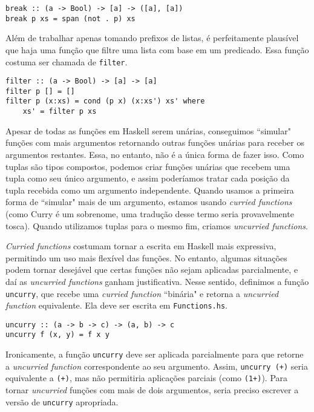 \documentclass[a4paper]{article}
\begin{document}
\begin{verbatim}
break :: (a -> Bool) -> [a] -> ([a], [a])
break p xs = span (not . p) xs
\end{verbatim}

Além de trabalhar apenas tomando prefixos de listas, é perfeitamente plausível que haja uma função que filtre uma lista com base em um predicado.
Essa função costuma ser chamada de \texttt{filter}.

\begin{verbatim}
filter :: (a -> Bool) -> [a] -> [a]
filter p [] = []
filter p (x:xs) = cond (p x) (x:xs') xs' where
	xs' = filter p xs
\end{verbatim}

Apesar de todas as funções em Haskell serem unárias, conseguimos ``simular" funções com mais argumentos retornando outras funções unárias para receber os argumentos restantes.
Essa, no entanto, não é a única forma de fazer isso.
Como tuplas são tipos compostos, podemos criar funções unárias que recebem uma tupla como seu único argumento, e assim poderíamos tratar cada posição da tupla recebida como um argumento independente.
Quando usamos a primeira forma de ``simular" mais de um argumento, estamos usando \emph{curried functions} (como Curry é um sobrenome, uma tradução desse termo seria provavelmente tosca).
Quando utilizamos tuplas para o mesmo fim, criamos \emph{uncurried functions}.

\emph{Curried functions} costumam tornar a escrita em Haskell mais expressiva, permitindo um uso mais flexível das funções.
No entanto, algumas situações podem tornar desejável que certas funções não sejam aplicadas parcialmente, e daí as \emph{uncurried functions} ganham justificativa.
Nesse sentido, definimos a função \texttt{uncurry}, que recebe uma \emph{curried function} ``binária" e retorna a \emph{uncurried function} equivalente.
Ela deve ser escrita em \texttt{Functions.hs}.

\begin{verbatim}
uncurry :: (a -> b -> c) -> (a, b) -> c
uncurry f (x, y) = f x y
\end{verbatim}

Ironicamente, a função \texttt{uncurry} deve ser aplicada parcialmente para que retorne a \emph{uncurried function} correspondente ao seu argumento.
Assim, \texttt{uncurry (+)} seria equivalente a \texttt{(+)}, mas não permitiria aplicações parciais (como \texttt{(1+)}).
Para tornar \emph{uncurried} funções com mais de dois argumentos, seria preciso escrever a versão de \texttt{uncurry} apropriada.
\end{document}

